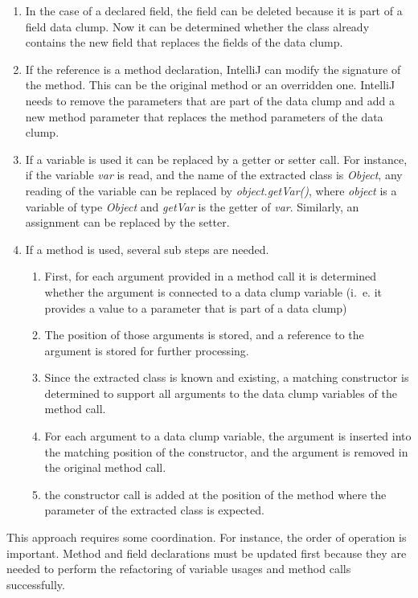 \begin{enumerate}
    \item In the case of a declared field, the field can be deleted because it is part of a field data clump. Now it can be determined whether the class already contains the new field that replaces the fields of the data clump.
    \item If the reference is a method declaration, IntelliJ can modify the signature of the method. This can be the original method or an overridden one. IntelliJ needs to remove the parameters that are part of the data clump and add a new method parameter that replaces the method parameters of the data clump. 
    \item If a variable is used it can be replaced by a getter or setter call. For instance, if the variable \textit{var} is read, and the name of the extracted class is \textit{Object}, any reading of the variable can be replaced by  \textit{object.getVar()}, where \textit{object} is a variable of type \textit{Object} and \textit{getVar} is the getter of \textit{var}. Similarly, an assignment can be replaced by the setter.
    \item If a method is used, several sub steps are needed.
    \begin{enumerate}
        \item First, for each argument provided in a method call it is determined whether the argument is connected to a data clump variable (i.~e. it provides a value to a parameter that is part of a data clump) 
        \item The position of those arguments is stored, and a reference to the argument is stored for further processing.
        \item Since the extracted class is known and existing, a matching constructor is determined to support all arguments to the data clump variables of the method call. 
        \item For each argument to a data clump variable, the argument is inserted into the matching position of the constructor, and the argument is removed in the original method call. 
        \item the constructor call is added at the position of the method  where the parameter of the extracted class is expected. 
        
    \end{enumerate}
    
\end{enumerate}

This approach requires some coordination. For instance, the order of operation is important. Method and field declarations must be updated first because they are needed to perform the refactoring of variable usages and method calls successfully. 

